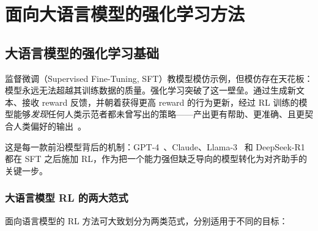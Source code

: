 \part{面向大语言模型的强化学习方法}

\chapter{大语言模型的强化学习基础}
\label{rl-foundations-for-language-models}

监督微调（Supervised Fine-Tuning, SFT）教模型模仿示例，但模仿存在天花板：模型永远无法超越其训练数据的质量。强化学习突破了这一壁垒。通过生成新文本、接收 reward 反馈，并朝着获得更高 reward 的行为更新，经过 RL 训练的模型能够\emph{发现}任何人类示范者都未曾写出的策略——产出更有帮助、更准确、且更契合人类偏好的输出~\cite{ouyang2022training}。

这是每一款前沿模型背后的机制：GPT-4~\cite{openai2023gpt4}、Claude、Llama-3~\cite{grattafiori2024llama3} 和 DeepSeek-R1~\cite{deepseek2025r1} 都在 SFT 之后施加 RL，作为把一个能力强但缺乏导向的模型转化为对齐助手的关键一步。

\section{大语言模型 RL 的两大范式}
\label{two-paradigms-rl-llms}

面向语言模型的 RL 方法可大致划分为两类范式，分别适用于不同的目标：

